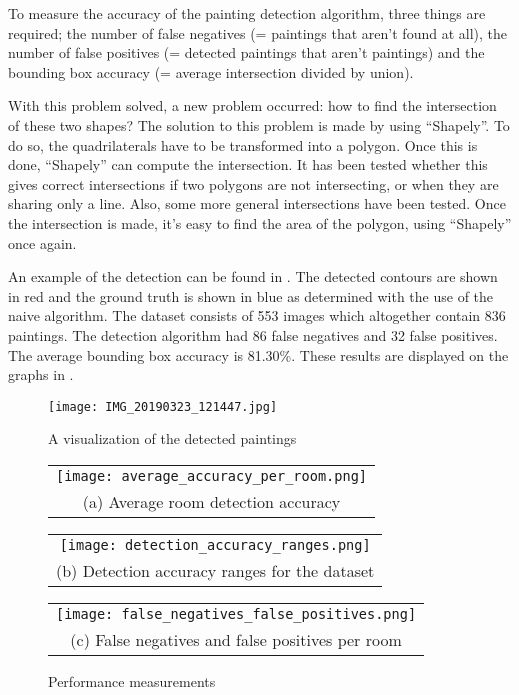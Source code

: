 To measure the accuracy of the painting detection algorithm, three things are required; the number of false negatives (= paintings that aren't found at all), the number of false positives (= detected paintings that aren't paintings) and the bounding box accuracy (= average intersection divided by union).

With this problem solved, a new problem occurred: how to find the intersection of these two shapes? The solution to this problem is made by using ``Shapely''. To do so, the quadrilaterals have to be transformed into a polygon. Once this is done, ``Shapely'' can compute the intersection. It has been tested whether this gives correct intersections if two polygons are not intersecting, or when they are sharing only a line. Also, some more general intersections have been tested. Once the intersection is made, it's easy to find the area of the polygon, using ``Shapely'' once again.

An example of the detection can be found in . The detected contours are shown in red and the ground truth is shown in blue as determined with the use of the naive algorithm. The dataset consists of 553 images which altogether contain 836 paintings. The detection algorithm had 86 false negatives and 32 false positives. The average bounding box accuracy is 81.30\%. These results are displayed on the graphs in .

\begin{figure}[ht]
    \texttt{[image: IMG\_20190323\_121447.jpg]}
    \centering
    \caption{A visualization of the detected paintings}
    \label{fig:paiting_detection_with_ground_truth}
\end{figure}

\begin{figure}
    \centering
    \begin{tabular}{@{}c@{}}
        \texttt{[image: average\_accuracy\_per\_room.png]} \\[\abovecaptionskip]
        \small (a) Average room detection accuracy
    \end{tabular}

    \vspace{\floatsep}

    \begin{tabular}{@{}c@{}}
        \texttt{[image: detection\_accuracy\_ranges.png]} \\[\abovecaptionskip]
        \small (b) Detection accuracy ranges for the dataset
    \end{tabular}

    \begin{tabular}{@{}c@{}}
        \texttt{[image: false\_negatives\_false\_positives.png]} \\[\abovecaptionskip]
        \small (c) False negatives and false positives per room
    \end{tabular}

    \caption{Performance measurements}
    \label{fig:performance-measurements}
\end{figure}

